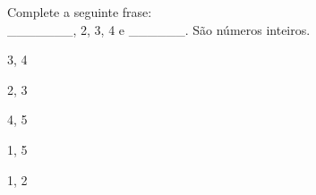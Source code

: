 \question[10]
Complete a seguinte frase:\\
_______, 2, 3, 4 e ______. São números inteiros.
\\
\begin{choices}
\item 3, 4 
\item 2, 3
\item 4, 5 
\item 1, 5 %
\item 1, 2 
\end{choices}
\answerline

